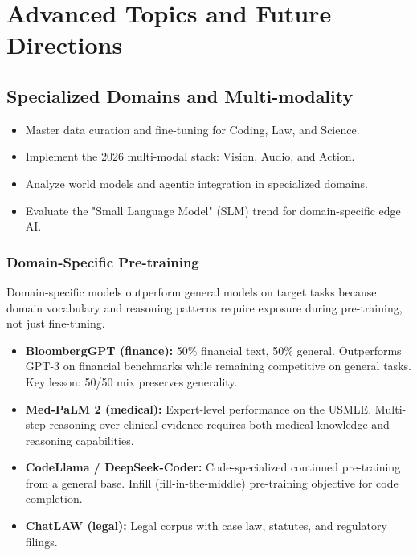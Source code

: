 \part{Advanced Topics and Future Directions}

\chapter{Specialized Domains and Multi-modality}
\minitoc

\begin{chapteroverview}
  \begin{itemize}
    \item Master data curation and fine-tuning for Coding, Law, and Science.
    \item Implement the 2026 multi-modal stack: Vision, Audio, and Action.
    \item Analyze world models and agentic integration in specialized domains.
    \item Evaluate the "Small Language Model" (SLM) trend for domain-specific edge AI.
  \end{itemize}
\end{chapteroverview}

\section{Domain-Specific Pre-training}

Domain-specific models outperform general models on target tasks because domain vocabulary and reasoning patterns require exposure during pre-training, not just fine-tuning.

\begin{itemize}
  \item \textbf{BloombergGPT \parencite{wu2023bloomberggpt} (finance):} 50\% financial text, 50\% general. Outperforms GPT-3 on financial benchmarks while remaining competitive on general tasks. Key lesson: 50/50 mix preserves generality.
  \item \textbf{Med-PaLM 2 \parencite{singhal2023large} (medical):} Expert-level performance on the USMLE. Multi-step reasoning over clinical evidence requires both medical knowledge and reasoning capabilities.
  \item \textbf{CodeLlama / DeepSeek-Coder:} Code-specialized continued pre-training from a general base. Infill (fill-in-the-middle) pre-training objective for code completion.
  \item \textbf{ChatLAW (legal):} Legal corpus with case law, statutes, and regulatory filings.
\end{itemize}

